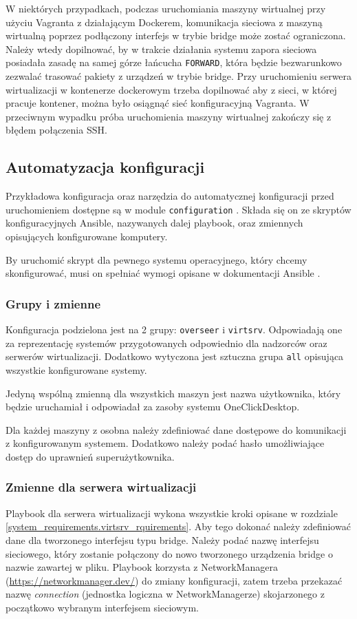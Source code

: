 \documentclass[../opis-rozwiazania.tex]{subfiles}
\begin{document}
W niektórych przypadkach, podczas uruchomiania maszyny wirtualnej przy użyciu Vagranta z działającym Dockerem, komunikacja sieciowa z maszyną wirtualną poprzez podłączony interfejs w trybie bridge może zostać ograniczona.
Należy wtedy dopilnować, by w trakcie działania systemu zapora sieciowa posiadała zasadę na samej górze łańcucha \texttt{FORWARD}, która będzie bezwarunkowo zezwalać trasować pakiety z urządzeń w trybie bridge.
Przy uruchomieniu serwera wirtualizacji w kontenerze dockerowym trzeba dopilnować aby z sieci, w której pracuje kontener, można było osiągnąć sieć konfiguracyjną Vagranta.
W przeciwnym wypadku próba uruchomienia maszyny wirtualnej zakończy się z błędem połączenia SSH.

\subsection{Automatyzacja konfiguracji}
\label{system_requirements.ansible_conf}
Przykładowa konfiguracja oraz narzędzia do automatycznej konfiguracji przed uruchomieniem dostępne są w module \texttt{configuration} \parencite{ocd-configuration}.
Składa się on ze skryptów konfiguracyjnych Ansible, nazywanych dalej playbook, oraz zmiennych opisujących konfigurowane komputery.

By uruchomić skrypt dla pewnego systemu operacyjnego, który chcemy skonfigurować, musi on spełniać wymogi opisane w dokumentacji Ansible \parencite{ansible-connection}.

\subsubsection{Grupy i zmienne}
Konfiguracja podzielona jest na 2 grupy: \texttt{overseer} i \texttt{virtsrv}.
Odpowiadają one za reprezentację systemów przygotowanych odpowiednio dla nadzorców oraz serwerów wirtualizacji.
Dodatkowo wytyczona jest sztuczna grupa \texttt{all} opisująca wszystkie konfigurowane systemy.

Jedyną wspólną zmienną dla wszystkich maszyn jest nazwa użytkownika, który będzie uruchamiał i odpowiadał za zasoby systemu OneClickDesktop.

Dla każdej maszyny z osobna należy zdefiniować dane dostępowe do komunikacji z konfigurowanym systemem. Dodatkowo należy podać hasło umożliwiające dostęp do uprawnień superużytkownika.

\subsubsection{Zmienne dla serwera wirtualizacji}
Playbook dla serwera wirtualizacji wykona wszystkie kroki opisane w rozdziale \ref{system_requirements.virtsrv_rquirements}.
Aby tego dokonać należy zdefiniować dane dla tworzonego interfejsu typu bridge.
Należy podać nazwę interfejsu sieciowego, który zostanie połączony do nowo tworzonego urządzenia bridge o nazwie zawartej w pliku.
Playbook korzysta z NetworkManagera (\url{https://networkmanager.dev/}) do zmiany konfiguracji, zatem trzeba przekazać nazwę \textit{connection} (jednostka logiczna w NetworkManagerze) skojarzonego z początkowo wybranym interfejsem sieciowym.
\end{document}
